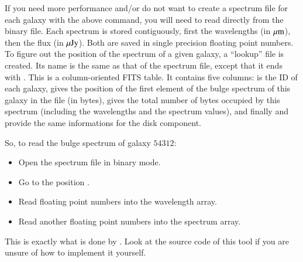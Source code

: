 \documentclass[12pt,a4paper]{article}
\newcommand{\um}{\mu{\rm m}}
\newcommand{\uJy}{\mu{\rm Jy}}
\begin{document}
If you need more performance and/or do not want to create a spectrum file for each galaxy with the above command, you will need to read directly from the binary file. Each spectrum is stored contiguously, first the wavelengths (in $\um$), then the flux (in $\uJy$). Both are saved in single precision floating point numbers. To figure out the position of the spectrum of a given galaxy, a ``lookup'' file is created. Its name is the same as that of the spectrum file, except that it ends with . This is a column-oriented FITS table. It contains five columns:  is the ID of each galaxy,  gives the position of the first element of the bulge spectrum of this galaxy in the file (in bytes),  gives the total number of bytes occupied by this spectrum (including the wavelengths and the spectrum values), and finally  and  provide the same informations for the disk component.

So, to read the bulge spectrum of galaxy $54312$:
\begin{itemize}
\item Open the spectrum file in binary mode.
\item Go to the position .
\item Read  floating point numbers into the wavelength array.
\item Read another  floating point numbers into the spectrum array.
\end{itemize}
This is exactly what is done by . Look at the source code of this tool if you are unsure of how to implement it yourself.

\subsection{}
\subsection{}
\subsection{}
\end{document}
